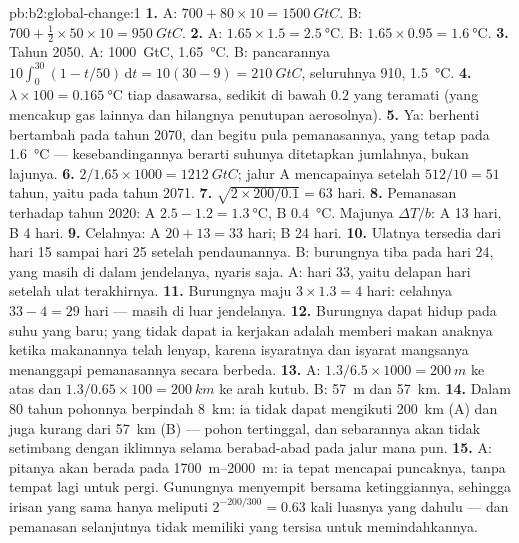 \begin{solution}{pb:b2:global-change:1}
\textbf{1.} A: $700 + 80\times 10 = \qty{1500}{GtC}$. B: $700 +
\tfrac12\times 50\times 10 = \qty{950}{GtC}$.
\textbf{2.} A: $1.65\times 1.5 = \qty{2.5}{\celsius}$. B:
$1.65\times 0.95 = \qty{1.6}{\celsius}$.
\textbf{3.} Tahun 2050. A: \qty{1000}{GtC}, \qty{1.65}{\celsius}. B:
pancarannya $10\int_0^{30}(1 - t/50)\,\mathrm{d}t = 10(30 - 9) =
\qty{210}{GtC}$, seluruhnya 910, \qty{1.5}{\celsius}.
\textbf{4.} $\lambda\times 100 = \qty{0.165}{\celsius}$ tiap
dasawarsa, sedikit di bawah $0.2$ yang teramati (yang mencakup gas
lainnya dan hilangnya penutupan aerosolnya).
\textbf{5.} Ya:  berhenti bertambah pada tahun
2070, dan begitu pula pemanasannya, yang tetap pada \qty{1.6}{\celsius}
--- kesebandingannya berarti suhunya ditetapkan jumlahnya, bukan
lajunya.
\textbf{6.} $2/1.65\times 1000 = \qty{1212}{GtC}$; jalur A mencapainya
setelah $512/10 = 51$ tahun, yaitu pada tahun 2071.
\textbf{7.} $\sqrt{2\times 200/0.1} = 63$ hari.
\textbf{8.} Pemanasan terhadap tahun 2020: A $2.5 - 1.2 =
\qty{1.3}{\celsius}$, B \qty{0.4}{\celsius}. Majunya $\Delta T/b$:
A 13 hari, B 4 hari.
\textbf{9.} Celahnya: A $20 + 13 = 33$ hari; B 24 hari.
\textbf{10.} Ulatnya tersedia dari hari 15 sampai hari 25 setelah
pendaunannya. B: burungnya tiba pada hari 24, yang masih di dalam
jendelanya, nyaris saja. A: hari 33, yaitu delapan hari setelah ulat
terakhirnya.
\textbf{11.} Burungnya maju $3\times 1.3 = 4$ hari: celahnya $33 - 4 =
29$ hari --- masih di luar jendelanya.
\textbf{12.} Burungnya dapat hidup pada suhu yang baru; yang tidak
dapat ia kerjakan adalah memberi makan anaknya ketika makanannya telah
lenyap, karena isyaratnya dan isyarat mangsanya menanggapi pemanasannya
secara berbeda.
\textbf{13.} A: $1.3/6.5\times 1000 = \qty{200}{m}$ ke atas dan
$1.3/0.65\times 100 = \qty{200}{km}$ ke arah kutub. B: \qty{57}{m} dan
\qty{57}{km}.
\textbf{14.} Dalam 80 tahun pohonnya berpindah \qty{8}{km}: ia tidak
dapat mengikuti \qty{200}{km} (A) dan juga kurang dari \qty{57}{km} (B)
--- pohon tertinggal, dan sebarannya akan tidak setimbang dengan
iklimnya selama berabad-abad pada jalur mana pun.
\textbf{15.} A: pitanya akan berada pada \qtyrange{1700}{2000}{m}: ia
tepat mencapai puncaknya, tanpa tempat lagi untuk pergi. Gunungnya
menyempit bersama ketinggiannya, sehingga irisan yang sama hanya
meliputi $2^{-200/300} = 0.63$ kali luasnya yang dahulu --- dan
pemanasan selanjutnya tidak memiliki  yang tersisa untuk
memindahkannya.

\end{solution}
